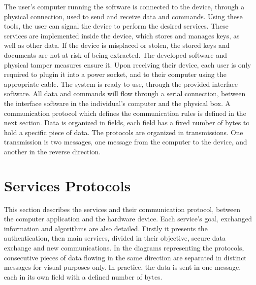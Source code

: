 The user's computer running the software is connected to the device, through a physical connection, used to send and receive data and commands.
Using these tools, the user can signal the device to perform the desired services.
These services are implemented inside the device, which stores and manages keys, as well as other data.
If the device is misplaced or stolen, the stored keys and documents are not at risk of being extracted. The developed software and physical tamper measures ensure it.
Upon receiving their device, each user is only required to plugin it into a power socket, and to their computer using the appropriate cable. The system is ready to use, through the provided interface software.
All data and commands will flow through a serial connection, between the interface software in the individual's computer and the physical box. A communication protocol which defines the communication rules is defined in the next section.
Data is organized in fields, each field has a fixed number of bytes to hold a specific piece of data.
The protocols are organized in transmissions. One transmission is two messages, one message from the computer to the device, and another in the reverse direction.

\section{Services Protocols}\label{chap:arch:services}

This section describes the services and their communication protocol, between the computer application and the hardware device. Each service's goal, exchanged information and algorithms are also detailed.
Firstly it presents the authentication, then main services, divided in their objective, secure data exchange and new communications. %
In the diagrams representing the protocols, consecutive pieces of data flowing in the same direction are separated in distinct messages for visual purposes only. In practice, the data is sent in one message, each in its own field with a defined number of bytes.


